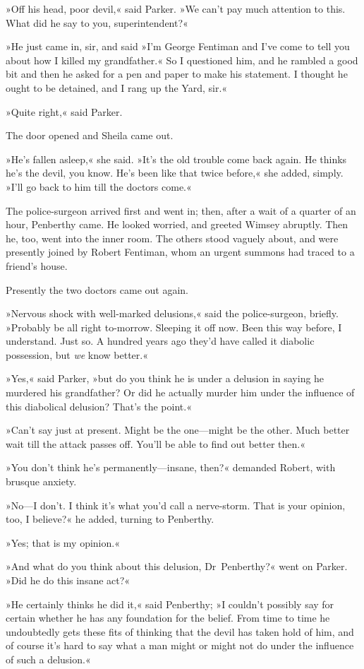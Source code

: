 »Off his head, poor devil,« said Parker. »We can't pay much attention to this. What did he say to you, superintendent?«

»He just came in, sir, and said »I'm George Fentiman and I've come to tell you about how I killed my grandfather.« So I questioned him, and he rambled a good bit and then he asked for a pen and paper to make his statement. I thought he ought to be detained, and I rang up the Yard, sir.«

»Quite right,« said Parker.

The door opened and Sheila came out.

»He's fallen asleep,« she said. »It's the old trouble come back again. He thinks he's the devil, you know. He's been like that twice before,« she added, simply. »I'll go back to him till the doctors come.«

The police-surgeon arrived first and went in; then, after a wait of a quarter of an hour, Penberthy came. He looked worried, and greeted Wimsey abruptly. Then he, too, went into the inner room. The others stood vaguely about, and were presently joined by Robert Fentiman, whom an urgent summons had traced to a friend's house.

Presently the two doctors came out again.

»Nervous shock with well-marked delusions,« said the police-surgeon, briefly. »Probably be all right to-morrow. Sleeping it off now. Been this way before, I understand. Just so. A hundred years ago they'd have called it diabolic possession, but \textit{we} know better.«

»Yes,« said Parker, »but do you think he is under a delusion in saying he murdered his grandfather? Or did he actually murder him under the influence of this diabolical delusion? That's the point.«

»Can't say just at present. Might be the one—might be the other. Much better wait till the attack passes off. You'll be able to find out better then.«

»You don't think he's permanently—insane, then?« demanded Robert, with brusque anxiety.

»No—I don't. I think it's what you'd call a nerve-storm. That is your opinion, too, I believe?« he added, turning to Penberthy.

»Yes; that is my opinion.«

»And what do you think about this delusion, Dr~Penberthy?« went on Parker. »Did he do this insane act?«

»He certainly thinks he did it,« said Penberthy; »I couldn't possibly say for certain whether he has any foundation for the belief. From time to time he undoubtedly gets these fits of thinking that the devil has taken hold of him, and of course it's hard to say what a man might or might not do under the influence of such a delusion.«

